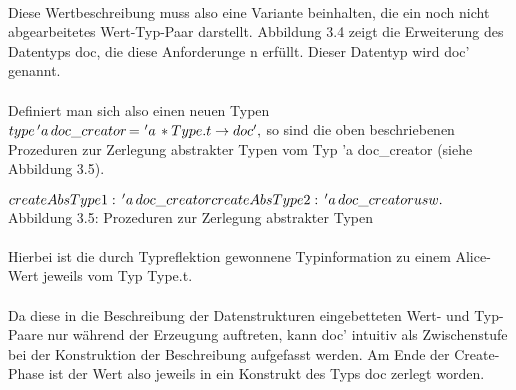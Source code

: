 \documentclass[12pt,a4paper]{article}
\begin{document}
\paragraph{}

Diese Wertbeschreibung muss also eine Variante 
beinhalten, die ein noch nicht abgearbeitetes 
Wert-Typ-Paar darstellt. Abbildung 3.4 zeigt die 
Erweiterung des Datentyps doc, die diese 
Anforderunge n erf\"ullt. Dieser Datentyp 
wird doc' genannt.

\paragraph{}

Definiert man sich also einen neuen Typen \newline
\begin{math}
type \, 'a \, doc\_creator \, $=$ \, \,'a \, * Type.t \rightarrow doc',
\end{math} \newline
so sind die oben beschriebenen Prozeduren zur 
Zerlegung abstrakter Typen vom Typ 'a doc\_creator (siehe Abbildung 3.5). 

\pagebreak

\begin{center}
\begin{math}
createAbsType1: \, 'a \, doc\_creator \newline
createAbsType2: \, 'a \, doc\_creator \newline 
usw. \newline
\end{math} \newline 
Abbildung 3.5: Prozeduren zur Zerlegung abstrakter Typen
\end{center}

\paragraph{}

Hierbei ist die durch Typreflektion gewonnene Typinformation 
zu einem Alice-Wert jeweils vom Typ Type.t.
 
\paragraph{}

Da diese in die Beschreibung der Datenstrukturen   
eingebetteten Wert- und Typ-Paare nur w\"ahrend der Erzeugung 
auftreten, kann doc' intuitiv als Zwischenstufe bei der 
Konstruktion der Beschreibung aufgefasst werden. Am Ende der 
Create-Phase ist der Wert also jeweils in ein Konstrukt des Typs doc
zerlegt worden.
\end{document}

